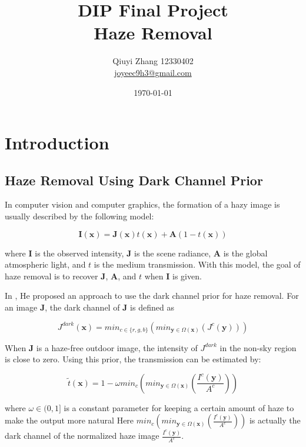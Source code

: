 \documentclass{article}
\begin{document}
\title {
	DIP Final Project \\
	Haze Removal
}

\author {
	Qiuyi Zhang 12330402 \\
	\href{mailto:joyeec9h3@gmail.com}{joyeec9h3@gmail.com}
}

\date {
	\today
}

\maketitle
\tableofcontents


\section{Introduction}

\subsection{Haze Removal Using Dark Channel Prior}
In computer vision and computer graphics, the formation of a hazy image is usually described by the following model:

$$
\mathbf{I}(\mathbf{x}) = \mathbf{J}(\mathbf{x})t(\mathbf{x}) + \mathbf{A}(1 - t(\mathbf{x}))
$$

where $\mathbf{I}$ is the observed intensity, $\mathbf{J}$ is the scene radiance, $\mathbf{A}$ is the global atmospheric light, and $t$ is the medium transmission. With this model, the goal of haze removal is to recover $\mathbf{J}$, $\mathbf{A}$, and $t$ when $\mathbf{I}$ is given.

In \cite{he2009single}, He proposed an approach to use the dark channel prior for haze removal. For an image $\mathbf{J}$, the dark channel of $\mathbf{J}$ is defined as

$$
J^{dark}(\mathbf{x}) = min_{c \in \{r,g,b\}}( min_{\mathbf{y} \in \Omega(\mathbf{x})}(J^c(\mathbf{y})))
$$

When $\mathbf{J}$ is a haze-free outdoor image, the intensity of $J^{dark}$ in the non-sky region is close to zero. Using this prior, the transmission can be estimated by:

$$
\tilde{t}(\mathbf{x}) = 1 - \omega min_{c}( min_{\mathbf{y} \in \Omega(\mathbf{x})}(\frac{I^c(\mathbf{y})}{A^c}))
$$

where $\omega \in (0, 1]$ is a constant parameter for keeping a certain amount of haze to make the output more natural Here $min_{c}( min_{\mathbf{y} \in \Omega(\mathbf{x})}(\frac{I^c(\mathbf{y})}{A^c}))$ is actually the dark channel of the normalized haze image $\frac{I^c(\mathbf{y})}{A^c}$.
\end{document}
